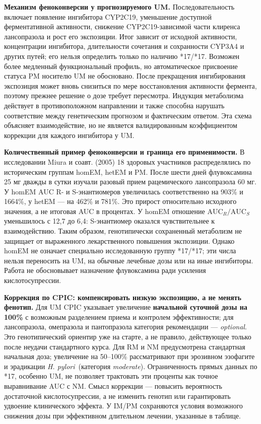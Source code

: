 \documentclass[11pt,a4paper,notitlepage]{report}
\newcommand{\Hp}{\textit{H. pylori}}
\newcommand{\src}[1]{\unskip\space\cite{#1}}
\begin{document}
\textbf{Механизм феноконверсии у прогнозируемого UM.} Последовательность включает появление ингибитора CYP2C19, уменьшение доступной ферментативной активности, снижение CYP2C19-зависимой части клиренса лансопразола и рост его экспозиции. Итог зависит от исходной активности, концентрации ингибитора, длительности сочетания и сохранности CYP3A4 и других путей; его нельзя определить только по наличию *17/*17. Возможен более медленный функциональный профиль, но автоматическое присвоение статуса PM носителю UM не обосновано. После прекращения ингибирования экспозиция может вновь снизиться по мере восстановления активности фермента, поэтому прежнее решение о дозе требует пересмотра. Индукция метаболизма действует в противоположном направлении и также способна нарушать соответствие между генетическим прогнозом и фактическим ответом. Эта схема объясняет взаимодействие, но не является валидированным коэффициентом коррекции для каждого ингибитора у UM.\src{cpic,molfluvox,uslabel}

\textbf{Количественный пример феноконверсии и граница его применимости.} В исследовании Miura и соавт. (2005) 18 здоровых участников распределялись по историческим группам homEM, hetEM и PM. После шести дней флувоксамина 25 мг дважды в сутки изучали разовый прием рацемического лансопразола 60 мг. У homEM AUC R- и S-энантиомеров увеличилась соответственно на 903\% и 1664\%, у hetEM --- на 462\% и 781\%. Это прирост относительно исходного значения, а не итоговая AUC в процентах. У homEM отношение $\mathrm{AUC}_R/\mathrm{AUC}_S$ уменьшилось с 12,7 до 6,4: S-энантиомер оказался чувствительнее к взаимодействию. Таким образом, генотипически сохраненный метаболизм не защищает от выраженного лекарственного повышения экспозиции. Однако homEM не означает специально исследованную группу *17/*17; эти числа нельзя переносить на UM, на обычные лечебные дозы или на иные ингибиторы. Работа не обосновывает назначение флувоксамина ради усиления кислотосупрессии.\src{molfluvox}

\textbf{Коррекция по CPIC: компенсировать низкую экспозицию, а не менять фенотип.} Для UM CPIC указывает увеличение \textbf{начальной суточной дозы на 100\%} с возможным разделением приема и контролем эффективности; для лансопразола, омепразола и пантопразола категория рекомендации --- \textit{optional}. Это генотипический ориентир уже на старте, а не правило, действующее только после неудачи стандартного курса. Для RM и NM предусмотрена стандартная начальная доза; увеличение на 50--100\% рассматривают при эрозивном эзофагите и эрадикации \Hp\ (категория \textit{moderate}). Ограниченность прямых данных по *17, особенно UM, не позволяет трактовать эти проценты как точное выравнивание AUC с NM. Смысл коррекции --- повысить вероятность достаточной кислотосупрессии, а не изменить генотип или гарантировать удвоение клинического эффекта. У IM/PM сохраняются условия возможного снижения дозы при эффективном длительном лечении, указанные в таблице.\src{cpic}
\end{document}
